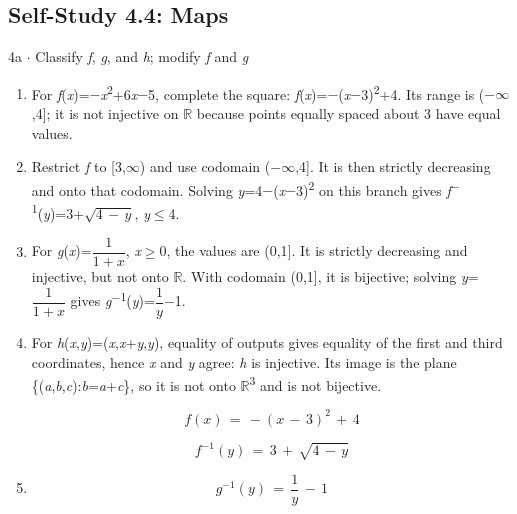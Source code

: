 \documentclass[11pt]{article}
\begin{document}
\begin{keepsection}\subsection{Self-Study 4.4: Maps}

\begin{workedbox}{4a \ensuremath{\cdot} Classify \textit{f}, \textit{g}, and \textit{h}; modify \textit{f} and \textit{g}}
\begin{enumerate}
\item For \textit{f}(\textit{x})=\ensuremath{-}\textit{x}\textsuperscript{2}+6\textit{x}\ensuremath{-}5, complete the square: \textit{f}(\textit{x})=\ensuremath{-}(\textit{x}\ensuremath{-}3)\textsuperscript{2}+4. Its range is (\ensuremath{-}\ensuremath{\infty},4]; it is not injective on \ensuremath{\mathbb{R}} because points equally spaced about 3 have equal values.
\item Restrict \textit{f} to [3,\ensuremath{\infty}) and use codomain (\ensuremath{-}\ensuremath{\infty},4]. It is then strictly decreasing and onto that codomain. Solving \textit{y}=4\ensuremath{-}(\textit{x}\ensuremath{-}3)\textsuperscript{2} on this branch gives \textit{f}\textsuperscript{\ensuremath{-}1}(\textit{y})=3+\ensuremath{\sqrt{4\, -\, {y}}}, \textit{y}\ensuremath{\leq}4.
\item For \textit{g}(\textit{x})={\small\ensuremath{\dfrac{1}{1+{x}}}}, \textit{x}\ensuremath{\geq}0, the values are (0,1]. It is strictly decreasing and injective, but not onto \ensuremath{\mathbb{R}}. With codomain (0,1], it is bijective; solving \textit{y}={\small\ensuremath{\dfrac{1}{1+{x}}}} gives \textit{g}\textsuperscript{\ensuremath{-}1}(\textit{y})={\small\ensuremath{\dfrac{1}{{y}}}}\ensuremath{-}1.
\item {}
For \textit{h}(\textit{x},\textit{y})=(\textit{x},\textit{x}+\textit{y},\textit{y}), equality of outputs gives equality of the first and third coordinates, hence \textit{x} and \textit{y} agree: \textit{h} is injective. Its image is the plane \{(\textit{a},\textit{b},\textit{c}):\textit{b}=\textit{a}+\textit{c}\}, so it is not onto \ensuremath{\mathbb{R}}\textsuperscript{3} and is not bijective.

\begin{equation*}{f}({x})\, =\, -({x}\, -\, 3)^{2}\, +\, 4\end{equation*}

\begin{equation*}{f}^{-1}({y})\, =\, 3\, +\, \sqrt{4\, -\, {y}}\end{equation*}
\item \begin{equation*}{g}^{-1}({y})\, =\, \dfrac{1}{{y}}\, -\, 1\end{equation*}
\end{enumerate}
\end{workedbox}

\end{keepsection}
\end{document}
